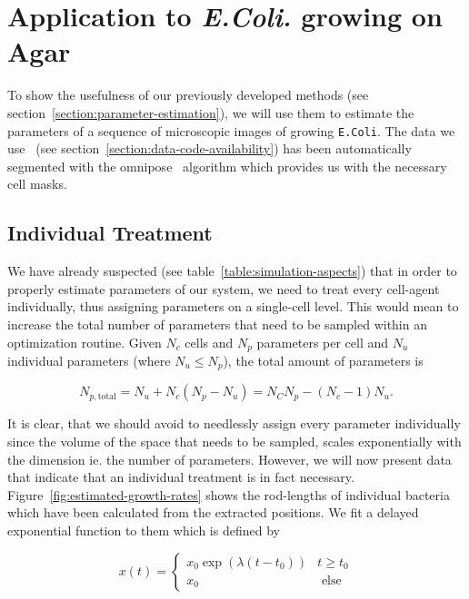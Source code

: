 \documentclass{article}
\begin{document}
\section{Application to \textit{E.Coli.} growing on Agar}
\label{section:application}

To show the usefulness of our previously developed methods (see
section~\ref{section:parameter-estimation}), we will use them to estimate the parameters of a
sequence of microscopic images of growing \texttt{E.Coli}.
The data we use~\cite{https://doi.org/10.3203/iwf/k-129} (see
section~\ref{section:data-code-availability}) has been automatically segmented with the
omnipose~\cite{Cutler2022} algorithm which provides us with the necessary cell masks.

\subsection{Individual Treatment}
We have already suspected (see table~\ref{table:simulation-aspects}) that in order to properly
estimate parameters of our system, we need to treat every cell-agent individually, thus assigning
parameters on a single-cell level.
This would mean to increase the total number of parameters that need to be sampled within an
optimization routine.
Given $N_c$ cells and $N_p$ parameters per cell and $N_u$ individual parameters (where
$N_u\leq N_p$), the total amount of parameters is

\begin{equation}
    N_{p,\text{total}} = N_u + N_c (N_p - N_u) = N_C N_p - (N_c - 1) N_u.
\end{equation}

It is clear, that we should avoid to needlessly assign every parameter individually since the volume
of the space that needs to be sampled, scales exponentially with the dimension ie. the number of
parameters.
However, we will now present data that indicate that an individual treatment is in fact necessary.
Figure~\ref{fig:estimated-growth-rates} shows the rod-lengths of individual bacteria which have been
calculated from the extracted positions.
We fit a delayed exponential function to them which is defined by

\begin{equation}
    x(t) =
    \left\{\begin{array}{ll}
            x_0 \exp(\lambda (t-t_0)) & t\geq t_0\\
            x_0 & \text{ else}
    \end{array}\right.
\end{equation}
\end{document}
